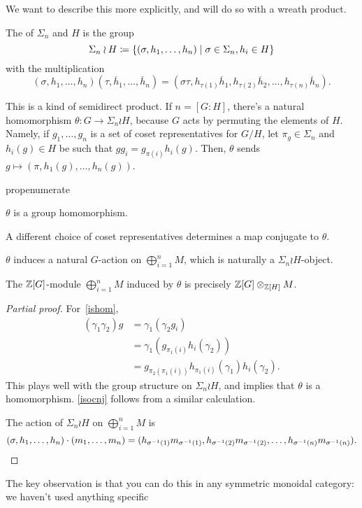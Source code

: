 We want to describe this more explicitly, and will do so with a wreath product.
\begin{defn}
The  of $\Sigma_n$ and $H$ is the group
\[\Sigma_n\wr H\coloneqq \{(\sigma, h_1,\dotsc,h_n)\mid \sigma\in\Sigma_n, h_i\in H\}\]
with the multiplication
\[(\sigma, h_1,\dotsc, h_n)(\tau, \overline h_1,\dotsc,\overline h_n) = (\sigma\tau, h_{\tau(1)}\overline h_1,
h_{\tau(2)}\overline h_2,\dotsc, h_{\tau(n)}\overline h_n).\]
\end{defn}
This is a kind of semidirect product. If $n = [G:H]$, there's a natural homomorphism $\theta\colon G\to\Sigma_n\wr
H$, because $G$ acts by permuting the elements of $H$. Namely, if $g_1,\dotsc,g_n$ is a set of coset
representatives for $G/H$, let $\pi_g\in\Sigma_n$ and $h_i(g)\in H$ be such that $gg_i = g_{\pi(i)} h_i(g)$. Then,
$\theta$ sends $g\mapsto (\pi, h_1(g),\dotsc,h_n(g))$.
\begin{comp}{prop}{enumerate}
	\item\label{ishom} $\theta$ is a group homomorphism.
	\item\label{isocnj} A different choice of coset representatives determines a map conjugate to $\theta$.
	\item\label{action} $\theta$ induces a natural $G$-action on $\bigoplus_{i=1}^n M$, which is naturally a
	$\Sigma_n\wr H$-object.
	\item The $\mathbb Z[G]$-module $\bigoplus_{i=1}^n M$ induced by $\theta$ is precisely $\mathbb Z[G]\otimes_{\mathbb Z[H]} M$.
\end{comp}
\begin{proof}[Partial proof]
For~\eqref{ishom},
\begin{align*}
	(\gamma_1\gamma_2)g &= \gamma_1(\gamma_2 g_i)\\
	&= \gamma_1(g_{\pi_1(i)} h_i(\gamma_2))\\
	&= g_{\pi_2(\pi_1(i))} h_{\pi_1(i)}(\gamma_1)h_i(\gamma_2).
\end{align*}
This plays well with the group structure on $\Sigma_n\wr H$, and implies that $\theta$ is a homomorphism.
\eqref{isocnj} follows from a similar calculation.

The action of $\Sigma_n\wr H$ on $\bigoplus_{i=1}^n M$ is
\[(\sigma,h_1,\dotsc,h_n)\cdot (m_1,\dotsc,m_n) = (h_{\sigma^{-1}(1)}m_{\sigma^{-1}(1)},
h_{\sigma^{-1}(2)}m_{\sigma^{-1}(2)},\dotsc, h_{\sigma^{-1}(n)} m_{\sigma^{-1}(n)}). \qedhere\]
\end{proof}
The key observation is that you can do this in any symmetric monoidal category: we haven't used anything specific
